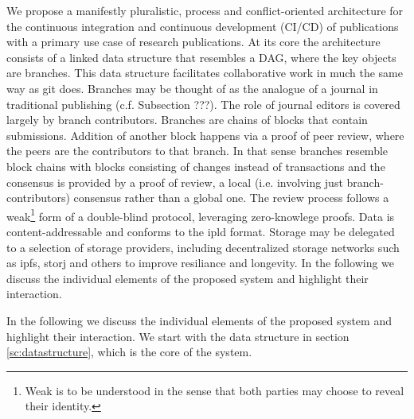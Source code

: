 % 
% 
% 
% 
 


We propose a manifestly pluralistic, process and conflict-oriented architecture for the continuous integration and continuous development (CI/CD) of publications with a primary use case of research publications. At its core the architecture consists of a linked data structure that resembles a DAG, where the key objects are branches. This data structure facilitates collaborative work in much the same way as git does. Branches may be thought of as the analogue of a journal in traditional publishing (c.f. Subsection ???). The role of journal editors is covered largely by branch contributors. Branches are chains of blocks that contain submissions. Addition of another block happens via a proof of peer review, where the peers are the contributors to that branch. In that sense branches resemble block chains with blocks consisting of changes instead of transactions and the consensus is provided by a  proof of review, a local (i.e. involving just branch-contributors) consensus rather than a global one.
The review process follows a weak\footnote{Weak is to be understood in the sense that both parties may choose to reveal their identity.} form of a double-blind protocol, leveraging zero-knowlege proofs.
Data is content-addressable and conforms to the ipld format. Storage may be delegated to a selection of storage providers, including decentralized storage networks such as ipfs, storj and others to improve resiliance and longevity. In the following we discuss the individual elements of the proposed system and highlight their interaction.

In the following we discuss the individual elements of the proposed system and highlight their interaction. We start with the data structure in section \ref{sc:datastructure}, which is the core of the system.